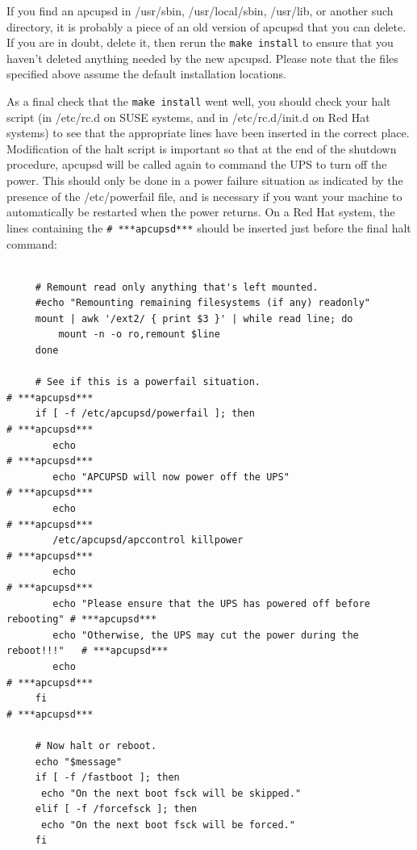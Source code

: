 If you find an apcupsd in /usr/sbin, /usr/local/sbin, /usr/lib, or another
such directory, it is probably a piece of an old version of apcupsd that you
can delete. If you are in doubt, delete it, then rerun the {\tt make install}
to ensure that you haven't deleted anything needed by the new apcupsd.  Please
note that the files specified above assume the default installation locations.
 

As a final check that the {\tt make install} went well, you should check your
halt script (in /etc/rc.d on SUSE systems, and in /etc/rc.d/init.d on Red Hat
systems) to see that the appropriate lines have been inserted in the correct
place. Modification of the halt script is important so that at the end of the
shutdown procedure, apcupsd will be called again to command the UPS to turn
off the power. This should only be done in a power failure situation as
indicated by the presence of the /etc/powerfail file, and is necessary if you
want your machine to automatically be restarted when the power returns. On a
Red Hat system, the lines containing the {\tt \# ***apcupsd***} should be
inserted just before the final halt command: 

\footnotesize
\begin{verbatim}
     
     # Remount read only anything that's left mounted.
     #echo "Remounting remaining filesystems (if any) readonly"
     mount | awk '/ext2/ { print $3 }' | while read line; do
         mount -n -o ro,remount $line
     done
     
     # See if this is a powerfail situation.                               # ***apcupsd***
     if [ -f /etc/apcupsd/powerfail ]; then                                # ***apcupsd***
        echo                                                               # ***apcupsd***
        echo "APCUPSD will now power off the UPS"                          # ***apcupsd***
        echo                                                               # ***apcupsd***
        /etc/apcupsd/apccontrol killpower                                  # ***apcupsd***
        echo                                                               # ***apcupsd***
        echo "Please ensure that the UPS has powered off before rebooting" # ***apcupsd***
        echo "Otherwise, the UPS may cut the power during the reboot!!!"   # ***apcupsd***
        echo                                                               # ***apcupsd***
     fi                                                                    # ***apcupsd***
     
     # Now halt or reboot.
     echo "$message"
     if [ -f /fastboot ]; then
      echo "On the next boot fsck will be skipped."
     elif [ -f /forcefsck ]; then
      echo "On the next boot fsck will be forced."
     fi
\end{verbatim}
\normalsize

